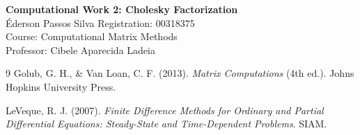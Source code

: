 \documentclass[12pt, a4paper]{article}
\begin{document}
\begin{center}
    {\Large \textbf{Computational Work 2: Cholesky Factorization}} \\[0.5em]
    {\large Éderson Passos Silva \quad Registration: 00318375} \\[0.2em]
    {\normalsize Course: Computational Matrix Methods} \\
    {\normalsize Professor: Cibele Aparecida Ladeia}
\end{center}
\vspace{1em}






\begin{thebibliography}{9}
    Golub, G. H., \& Van Loan, C. F. (2013). \emph{Matrix Computations} (4th ed.). Johns Hopkins University Press.

    LeVeque, R. J. (2007). \emph{Finite Difference Methods for Ordinary and Partial Differential Equations: Steady-State and Time-Dependent Problems}. SIAM.
\end{thebibliography}

\newpage
\appendix

\end{document}
